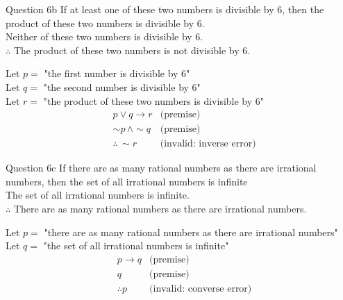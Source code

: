 \documentclass[10pt]{beamer}
\begin{document}
\begin{frame}[fragile]{Question 6b}
    If at least one of these two numbers is divisible by 6, then the product of these two numbers is divisible by 6. \\
    Neither of these two numbers is divisible by 6. \\
    $\therefore$ The product of these two numbers is not divisible by 6. \par
    Let $p =$ "the first number is divisible by 6" \\
    Let $q =$ "the second number is divisible by 6" \\
    Let $r =$ "the product of these two numbers is divisible by 6"
\begin{align*}
    &p \lor q \rightarrow r &\text{(premise)} \\
    &\sim p \,\land \sim q &\text{(premise)} \\
    &\therefore \,\sim r &\text{(invalid: inverse error)}
\end{align*}
\end{frame}

\begin{frame}[fragile]{Question 6c}
    If there are as many rational numbers as there are irrational numbers, then the set of all irrational numbers is infinite \\
    The set of all irrational numbers is infinite. \\
    $\therefore$ There are as many rational numbers as there are irrational numbers. \par
    Let $p =$ "there are as many rational numbers as there are irrational numbers" \\
    Let $q =$ "the set of all irrational numbers is infinite" 
\begin{align*}
    &p \rightarrow q &\text{(premise)} \\
    &q &\text{(premise)} \\
    &\therefore p &\text{(invalid: converse error)}
\end{align*}
\end{frame}
\end{document}
